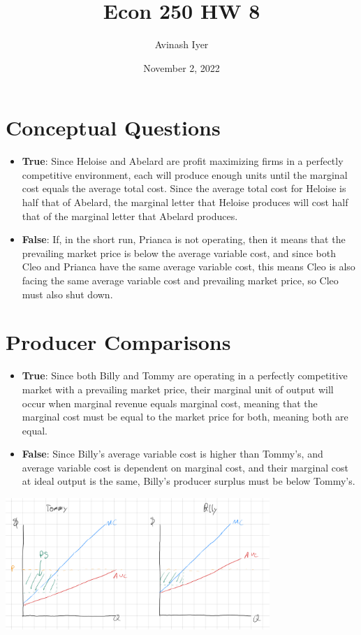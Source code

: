 \documentclass[8pt]{extarticle}
\title{Econ 250 HW 8}
\author{Avinash Iyer}
\date{November 2, 2022}
\begin{document}
{
\maketitle
\section*{Conceptual Questions}
\begin{itemize}
	\item \textbf{True}: Since Heloise and Abelard are profit maximizing firms in a perfectly competitive environment, each will produce enough units until the marginal cost equals the average total cost. Since the average total cost for Heloise is half that of Abelard, the marginal letter that Heloise produces will cost half that of the marginal letter that Abelard produces.
	\item \textbf{False}: If, in the short run, Prianca is not operating, then it means that the prevailing market price is below the average variable cost, and since both Cleo and Prianca have the same average variable cost, this means Cleo is also facing the same average variable cost and prevailing market price, so Cleo must also shut down.
\end{itemize}
\section*{Producer Comparisons}
\begin{itemize}
	\item \textbf{True}: Since both Billy and Tommy are operating in a perfectly competitive market with a prevailing market price, their marginal unit of output will occur when marginal revenue equals marginal cost, meaning that the marginal cost must be equal to the market price for both, meaning both are equal.
	\item \textbf{False}: Since Billy's average variable cost is higher than Tommy's, and average variable cost is dependent on marginal cost, and their marginal cost at ideal output is the same, Billy's producer surplus must be below Tommy's.
\end{itemize}
\begin{center}
	\includegraphics[width=10cm]{HW8Q2B}
\end{center}
}
\end{document}
